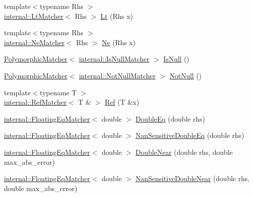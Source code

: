 \begin{DoxyCompactItemize}
\item 
{\footnotesize template$<$typename Rhs $>$ }\\\hyperlink{classtesting_1_1internal_1_1_lt_matcher}{internal\+::\+Lt\+Matcher}$<$ Rhs $>$ \hyperlink{namespacetesting_ad621459957a8bcdd3c256b7940ecbf99}{Lt} (Rhs x)
\item 
{\footnotesize template$<$typename Rhs $>$ }\\\hyperlink{classtesting_1_1internal_1_1_ne_matcher}{internal\+::\+Ne\+Matcher}$<$ Rhs $>$ \hyperlink{namespacetesting_afe42d41d5171234cb9da5da27faeb7e8}{Ne} (Rhs x)
\item 
\hyperlink{classtesting_1_1_polymorphic_matcher}{Polymorphic\+Matcher}$<$ \hyperlink{classtesting_1_1internal_1_1_is_null_matcher}{internal\+::\+Is\+Null\+Matcher} $>$ \hyperlink{namespacetesting_a56ffb1a169c14ce585fc5bed32add2db}{Is\+Null} ()
\item 
\hyperlink{classtesting_1_1_polymorphic_matcher}{Polymorphic\+Matcher}$<$ \hyperlink{classtesting_1_1internal_1_1_not_null_matcher}{internal\+::\+Not\+Null\+Matcher} $>$ \hyperlink{namespacetesting_a39d1f92b53b8b2a0b6db6a22ac146416}{Not\+Null} ()
\item 
{\footnotesize template$<$typename T $>$ }\\\hyperlink{classtesting_1_1internal_1_1_ref_matcher}{internal\+::\+Ref\+Matcher}$<$ T \& $>$ \hyperlink{namespacetesting_a0a4a364121ea3fa656a112f1c2e6b7a4}{Ref} (T \&x)
\item 
\hyperlink{classtesting_1_1internal_1_1_floating_eq_matcher}{internal\+::\+Floating\+Eq\+Matcher}$<$ double $>$ \hyperlink{namespacetesting_a1f49f9d97f03bfa4db26888f03486a9f}{Double\+Eq} (double rhs)
\item 
\hyperlink{classtesting_1_1internal_1_1_floating_eq_matcher}{internal\+::\+Floating\+Eq\+Matcher}$<$ double $>$ \hyperlink{namespacetesting_aa83ee35256fd90033f615ef640245525}{Nan\+Sensitive\+Double\+Eq} (double rhs)
\item 
\hyperlink{classtesting_1_1internal_1_1_floating_eq_matcher}{internal\+::\+Floating\+Eq\+Matcher}$<$ double $>$ \hyperlink{namespacetesting_aaee08ecb6815ef8398bbcb4e56d56d44}{Double\+Near} (double rhs, double max\+\_\+abs\+\_\+error)
\item 
\hyperlink{classtesting_1_1internal_1_1_floating_eq_matcher}{internal\+::\+Floating\+Eq\+Matcher}$<$ double $>$ \hyperlink{namespacetesting_a3caa8177ef48150d0dde3a54b0961f7f}{Nan\+Sensitive\+Double\+Near} (double rhs, double max\+\_\+abs\+\_\+error)
\item 

\end{DoxyCompactItemize}
